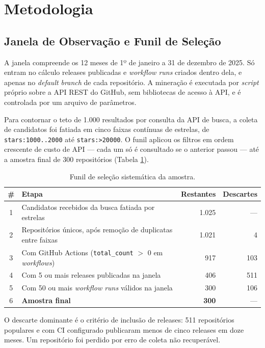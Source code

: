 \section{Metodologia}
\label{sec:metodologia}

\subsection{Janela de Observação e Funil de Seleção}

A janela compreende os 12 meses de 1º de janeiro a 31 de dezembro de 2025. Só entram no
cálculo releases publicadas e \emph{workflow runs} criados dentro dela, e apenas no
\emph{default branch} de cada repositório. A mineração é executada por \emph{script}
próprio sobre a API REST do GitHub, sem bibliotecas de acesso à API, e é controlada por um
arquivo de parâmetros.

Para contornar o teto de 1.000 resultados por consulta da API de busca, a coleta de
candidatos foi fatiada em cinco faixas contínuas de estrelas, de \texttt{stars:1000..2000}
até \texttt{stars:>20000}. O funil aplicou os filtros em ordem crescente de custo de API ---
cada um só é consultado se o anterior passou --- até a amostra final de 300 repositórios
(Tabela \ref{tab:funil}).

\begin{table}[ht]
\centering
\caption{Funil de seleção sistemática da amostra.}
\label{tab:funil}
\footnotesize
\begin{tabular}{clrr}
\toprule
\textbf{\#} & \textbf{Etapa} & \textbf{Restantes} & \textbf{Descartes} \\
\midrule
1 & Candidatos recebidos da busca fatiada por estrelas & 1.025 & --- \\
2 & Repositórios únicos, após remoção de duplicatas entre faixas & 1.021 & 4 \\
3 & Com GitHub Actions (\texttt{total\_count} $>$ 0 em \emph{workflows}) & 917 & 103 \\
4 & Com 5 ou mais releases publicadas na janela & 406 & 511 \\
5 & Com 50 ou mais \emph{workflow runs} válidos na janela & 300 & 106 \\
\midrule
6 & \textbf{Amostra final} & \textbf{300} & --- \\
\bottomrule
\end{tabular}
\end{table}

O descarte dominante é o critério de inclusão de releases: 511 repositórios populares e com
CI configurado publicaram menos de cinco releases em doze meses. Um repositório foi perdido
por erro de coleta não recuperável.

